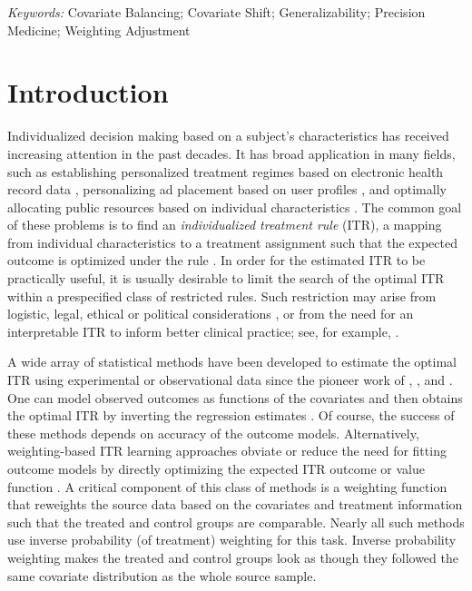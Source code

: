 \documentclass[12pt]{article}
\begin{document}
\noindent%
{\it Keywords:}  Covariate Balancing; Covariate Shift; Generalizability; Precision Medicine; Weighting Adjustment
\vfill



\newpage
{} %
\setlength{\abovedisplayskip}{7pt}%
\setlength{\belowdisplayskip}{7pt}%
\setlength{\abovedisplayshortskip}{5pt}%
\setlength{\belowdisplayshortskip}{5pt}%


\section{Introduction}
Individualized decision making based on a subject's characteristics has received increasing attention in the past decades. It has broad application in many fields, such as establishing personalized treatment regimes based on electronic health record data \citep{wang2016learning}, personalizing ad placement based on user profiles \citep{bottou2013counterfactual}, and optimally allocating public resources based on individual characteristics \citep{kube2019allocating}. The common goal of these problems is to find an \textit{individualized treatment rule} (ITR), a mapping from individual characteristics to a treatment assignment such that the expected outcome is optimized under the rule \citep{murphy2001marginal,murphy2003optimal,robins2004optimal}. In order for the estimated ITR to be practically useful, it is usually desirable to limit the search of the optimal ITR within a prespecified class of restricted rules. Such restriction may arise from logistic, legal, ethical or political considerations \citep{kitagawa2018should,athey2021policy}, or from the need for an interpretable ITR to inform better clinical practice; see, for example, \citet{zhang2018interpretable,murdoch2019definitions}.

A wide array of statistical methods have been developed to estimate the optimal ITR using experimental or observational data \citep{kosorok2019precision} since the pioneer work of \citet{murphy2001marginal}, \citet{murphy2003optimal}, and \citet{robins2004optimal}. One can model observed outcomes as functions of the covariates and then obtains the optimal ITR by inverting the regression estimates \citep{qian2011performance, foster2011subgroup}.  Of course, the success of these methods depends on accuracy of the outcome models. Alternatively, weighting-based ITR learning approaches obviate or reduce the need for fitting outcome models by directly optimizing the expected ITR outcome or value function \citep{zhao2012estimating,zhou2017residual,chen2017general}. A critical component of this class of methods is a weighting function that reweights the source data based on the covariates and treatment information such that the treated and control groups are comparable. Nearly all such methods use inverse probability (of treatment) weighting for this task. Inverse probability weighting makes the treated and control groups look as though they followed the same covariate distribution as the whole source sample. 
\end{document}

